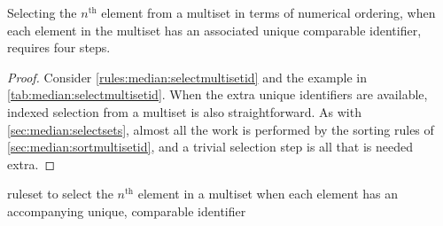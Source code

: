 \begin{proposition}\label{prop:median:selectmultisetid}
Selecting the \(n^{\text{th}}\) element from a multiset in terms of numerical ordering, when each element in the multiset has an associated unique comparable identifier, requires four steps.
\end{proposition}

\begin{proof}
Consider \cref{rules:median:selectmultisetid} and the example in \cref{tab:median:selectmultisetid}.  When the extra unique identifiers are available, indexed selection from a multiset is also straightforward. As with \cref{sec:median:selectsets}, almost all the work is performed by the sorting rules of \cref{sec:median:sortmultisetid}, and a trivial selection step is all that is needed extra.
\end{proof}

\begin{cprulesetfloat} \begin{cpruleset}



\end{cpruleset}
\caption{\label{rules:median:selectmultisetid}\Gls{ruleset} to select the \(n^{\text{th}}\) element in a multiset when each element has an accompanying unique, comparable identifier}
\end{cprulesetfloat}

